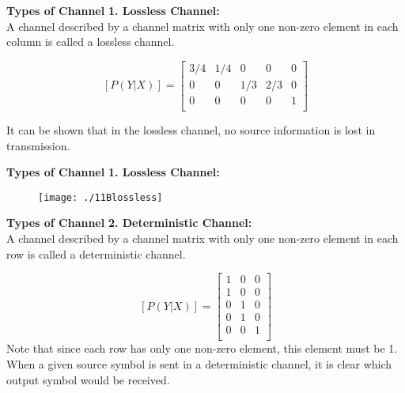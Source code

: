 

\noindent \textbf{Types of Channel}
\textbf{ 1. Lossless Channel:}\\
A channel described by a channel matrix with only one non-zero element in each column is called a lossless channel.


\[  [P(Y|X)]  =  \left[ \begin{array}{ccccc}
3/4 & 1/4 &0 & 0&0\\
0  & 0 &1/3 & 2/3& 0\\
0  & 0& 0&0 &1 \\
\end{array} \right]  \]

It can be shown that in the lossless channel, no source information is lost in transmission.


\noindent \textbf{Types of Channel}
\textbf{ 1. Lossless Channel:}\\

\begin{figure}
\centering
\texttt{[image: ./11Blossless]}
\caption{}
\label{fig:11Blossless}
\end{figure}





\noindent \textbf{Types of Channel}
\textbf{2. Deterministic Channel:}\\
A channel described by a channel matrix with only one non-zero element in each row is called a deterministic channel.

\[  [P(Y|X)]  =  \left[ \begin{array}{ccc}
1   & 0 &0 \\
1  & 0 &0\\
0  & 1 &0\\
0  & 1& 0 \\
0  & 0& 1 \\
\end{array} \right]  \]
Note that since each row has only one non-zero element, this element must be 1. When a given source symbol is sent in a deterministic channel, it is clear which output symbol would be received.


